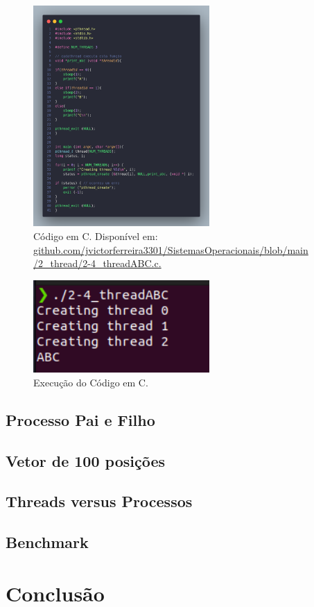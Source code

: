 \documentclass[
	12pt,				%
	openright,			%
	oneside,			%
	a4paper,			%
	chapter=TITLE,		%
	english,			%
	french,				%
	spanish,			%
	brazil				%
	]{abntex2}
\theoremstyle{definition}
\begin{document}
\begin{figure}
    \centering
    \includegraphics[width=0.6\textwidth]{imagens/processos_4.png}
	\caption{Código em C. Disponível em: \href{https://github.com/jvictorferreira3301/Sistemas_Operacionais/blob/main/2_thread/2-4_threadABC.c}{github.com/jvictorferreira3301/SistemasOperacionais/blob/main
    /2\_thread/2-4\_threadABC.c.}}
	\label{fig:processos4}
\end{figure}

\begin{figure}
    \centering
    \includegraphics[width=0.6\textwidth]{imagens/run_processos_4.png}
    \caption{Execução do Código em C.}
    \label{fig:run4}
\end{figure}
\section{Processo Pai e Filho}

\section{Vetor de 100 posições}

\section{Threads versus Processos}

\section{Benchmark}

\chapter{Conclusão}
\label{conclusao}





\postextual



\cite{tanenbaum2010sistemas}
\end{document}
